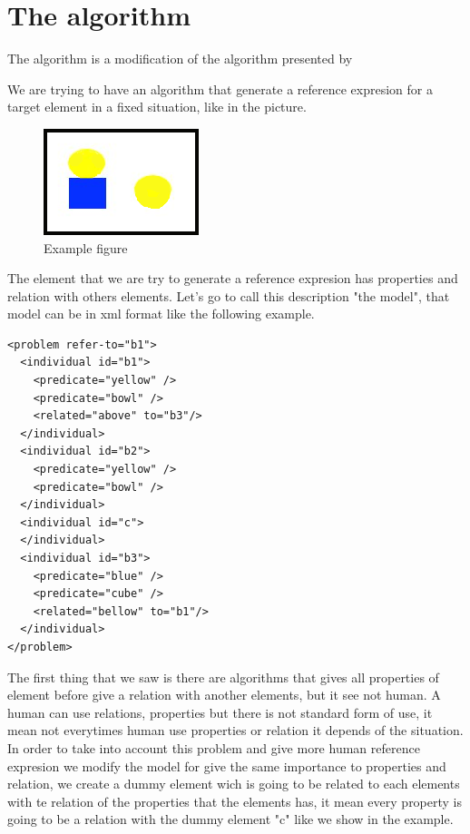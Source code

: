 \section{The algorithm}
\label{sec:algorithm}



The algorithm is a modification of the algorithm presented by \cite{Areces2008}

We are trying to have an algorithm that generate a reference expresion for a target element in a fixed situation, like in the picture. 
\begin{figure}[htb]
\centering
\includegraphics[angle=0,width=0.3\linewidth]{yellowBallBlueCube}
\caption{ 
\label{figura1}
Example figure
}
\end{figure}
The element that we are try to generate a reference expresion has properties and relation with others elements. Let's go to call this description "the model", that model can be in xml format like the following example.
\begin{verbatim}
<problem refer-to="b1">
  <individual id="b1">
    <predicate="yellow" />
    <predicate="bowl" />
    <related="above" to="b3"/>
  </individual>
  <individual id="b2">
    <predicate="yellow" />
    <predicate="bowl" />
  </individual>
  <individual id="c">
  </individual>
  <individual id="b3">
    <predicate="blue" />
    <predicate="cube" />
    <related="bellow" to="b1"/>
  </individual>
</problem>
\end{verbatim}
The first thing that we saw is there are algorithms that gives all properties of element before give a relation with another elements, but it see not human. A human can use relations, properties but there is not standard form of use, it mean not everytimes human use properties or relation it depends of the situation. In order to take into account this problem and give more human reference expresion we modify the model for give the same importance to properties and relation, we create a dummy element wich is going to be related to each elements with te relation of the properties that the elements has, it mean every property is going to be a relation with the dummy element "c" like we show in the example.

